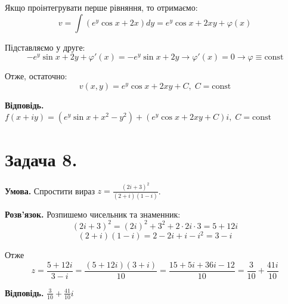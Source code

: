 \documentclass[14pt]{extarticle}
\begin{document}
Якщо проінтегрувати перше рівняння, то отримаємо:
\[
v = \int \left(e^y \cos x + 2x\right)dy = e^y \cos x + 2xy + \varphi(x)
\]

Підставляємо у друге:
\[
-e^y \sin x + 2y + \varphi'(x) = -e^y \sin x + 2y \to \varphi'(x)=0 \to \varphi \equiv \text{const}
\]

Отже, остаточно:
\[
v(x,y) = e^y \cos x + 2xy + C, \; C = \text{const}
\]

\textbf{Відповідь.} $f(x+iy)=(e^y\sin x+x^2-y^2)+(e^y\cos x + 2x y + C)i, \; C = \text{const}$

\pagebreak
\section*{Задача 8.}

\textbf{Умова.} Спростити вираз $z=\frac{(2i+3)^2}{(2+i)(1-i)}$.

\textbf{Розв'язок.} Розпишемо чисельник та знаменник:
\[
(2i+3)^2 = (2i)^2 + 3^2 + 2 \cdot 2i \cdot 3 = 5 + 12i
\]
\[
(2+i)(1-i) = 2 - 2i + i - i^2 = 3-i
\]

Отже
\[
z = \frac{5+12i}{3-i} = \frac{(5+12i)(3+i)}{10} = \frac{15+5i+36i-12}{10} = \frac{3}{10} + \frac{41i}{10}
\]

\textbf{Відповідь.} $\frac{3}{10}+\frac{41}{10}i$
\end{document}
